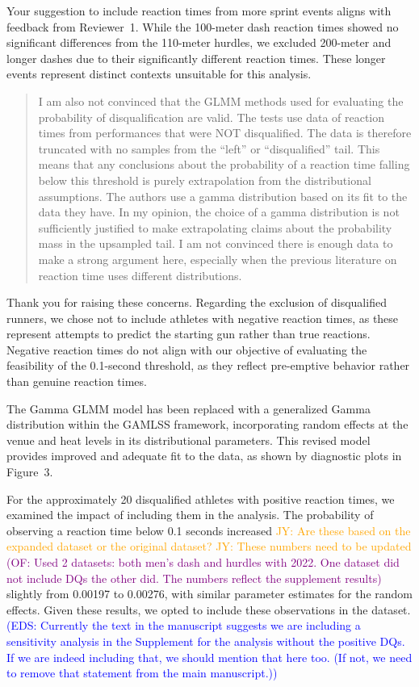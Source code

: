 \documentclass[12pt]{article}
\newcommand{\jy}[1]{\textcolor{orange}{JY: #1}}
\newcommand{\eds}[1]{\textcolor{blue}{(EDS: #1)}}
\newcommand{\of}[1]{\textcolor{purple}{(OF: #1)}}
\newenvironment{comment}%
{\begin{quotation}\noindent\small\it\color{darkblue}\ignorespaces%
}{\end{quotation}}
\begin{document}
Your suggestion to include reaction times from more sprint events aligns 
with feedback from Reviewer~1.  While the 100-meter dash reaction times 
showed no significant differences from the 110-meter hurdles, we excluded 
200-meter and longer dashes due to their significantly different reaction 
times. These longer events represent distinct contexts unsuitable for this 
analysis.


\begin{comment}
I am also not convinced that the GLMM methods used for evaluating the
probability of disqualification are valid. The tests use data of reaction times
from performances that were NOT disqualified.  The data is therefore truncated
with no samples from the “left” or “disqualified” tail. This means that any
conclusions about the probability of a reaction time falling below this
threshold is purely extrapolation from the distributional assumptions. The
authors use a gamma distribution based on its fit to the data they have. In my
opinion, the choice of a gamma distribution is not sufficiently justified to
make extrapolating claims about the probability mass in the upsampled tail. I am
not convinced there is enough data to make a strong argument here, especially
when the previous literature on reaction time uses different distributions.
\end{comment}



Thank you for raising these concerns. Regarding the exclusion of 
disqualified runners, we chose not to include athletes with negative 
reaction times, as these represent attempts to predict the starting gun 
rather than true reactions. Negative reaction times do not align with 
our objective of evaluating the feasibility of the 0.1-second threshold, 
as they reflect pre-emptive behavior rather than genuine reaction
times.


The Gamma GLMM model has been replaced with a generalized Gamma 
distribution within the GAMLSS framework, incorporating random effects 
at the venue and heat levels in its distributional parameters. This 
revised model provides improved and adequate fit to the data, as shown 
by diagnostic plots in Figure~3.


For the approximately 20 disqualified athletes with positive reaction
times, we examined the impact of including them in the analysis. The
probability of observing a reaction time below 0.1 seconds increased
\jy{Are these based on the expanded dataset or the original dataset?}
\jy{These numbers need to be updated}
\of{Used 2 datasets: both men's dash and hurdles with 2022.  One dataset did not
include DQs the other did. The numbers reflect the supplement results}
slightly from 0.00197 to 0.00276, with similar parameter estimates for
the random effects. Given these results, we opted to include these
observations in the dataset.
\eds{Currently the text in the manuscript suggests we are including a 
sensitivity analysis in the Supplement for the analysis without the positive DQs.
If we are indeed including that, we should mention that here too. (If not, we 
need to remove that statement from the main manuscript.)}
\end{document}
